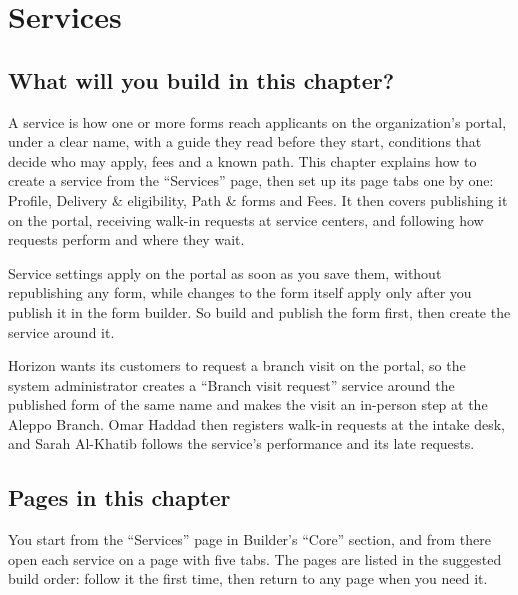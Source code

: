 \chapter{Services}
\label{ch:builder-services}

\section{What will you build in this chapter?}
\label{sec:builder-services-intro}

A service is how one or more forms reach applicants on the organization's portal, under a clear name, with a guide they read before they start, conditions that decide who may apply, fees and a known path. This chapter explains how to create a service from the “Services” page, then set up its page tabs one by one: Profile, Delivery \& eligibility, Path \& forms and Fees. It then covers publishing it on the portal, receiving walk-in requests at service centers, and following how requests perform and where they wait.

Service settings apply on the portal as soon as you save them, without republishing any form, while changes to the form itself apply only after you publish it in the form builder. So build and publish the form first, then create the service around it.

\begin{rcnote}
Horizon wants its customers to request a branch visit on the portal, so the system administrator creates a “Branch visit request” service around the published form of the same name and makes the visit an in-person step at the Aleppo Branch. Omar Haddad then registers walk-in requests at the intake desk, and Sarah Al-Khatib follows the service's performance and its late requests.
\end{rcnote}

\section{Pages in this chapter}
\label{sec:builder-services-pages}

You start from the “Services” page in Builder's “Core” section, and from there open each service on a page with five tabs. The pages are listed in the suggested build order: follow it the first time, then return to any page when you need it.

